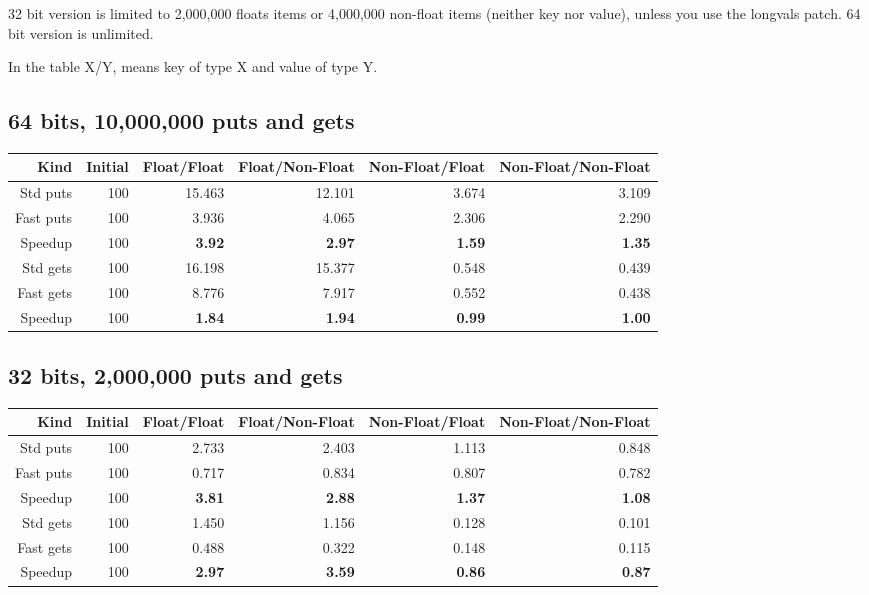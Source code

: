 \documentclass{article}
\begin{document}
32 bit version is limited to 2,000,000 floats items or 4,000,000
non-float items (neither key nor value), unless you use the longvals
patch.  64 bit version is unlimited.

In the table X/Y, means key of type X and value of type Y.

\subsection*{64 bits, 10,000,000 puts and gets}

\begin{tabular}{|r|r|r|r|r|r|} \hline
Kind & Initial & Float/Float & Float/Non-Float & Non-Float/Float & Non-Float/Non-Float \\ \hline
Std puts  & 100 & 15.463 & 12.101 & 3.674 & 3.109 \\ \hline
Fast puts & 100 & 3.936 & 4.065 & 2.306 & 2.290 \\ \hline
Speedup & 100 &\bf 3.92 &\bf 2.97 &\bf 1.59 &\bf 1.35 \\ \hline
Std gets & 100 & 16.198 & 15.377 & 0.548 & 0.439 \\ \hline
Fast gets & 100 & 8.776 & 7.917 & 0.552 & 0.438 \\ \hline
Speedup & 100 &\bf 1.84 &\bf 1.94 &\bf 0.99 &\bf 1.00  \\ \hline
\end{tabular}

\subsection*{32 bits, 2,000,000 puts and gets}

\begin{tabular}{|r|r|r|r|r|r|} \hline
Kind & Initial & Float/Float & Float/Non-Float & Non-Float/Float & Non-Float/Non-Float \\ \hline
Std puts  & 100 & 2.733 & 2.403 & 1.113 & 0.848 \\ \hline
Fast puts & 100 & 0.717 & 0.834 & 0.807 & 0.782 \\ \hline
Speedup   & 100 &\bf 3.81 &\bf 2.88 &\bf 1.37 &\bf 1.08 \\ \hline
Std gets  & 100 & 1.450 & 1.156 & 0.128 & 0.101 \\ \hline
Fast gets & 100 & 0.488 & 0.322 & 0.148 & 0.115 \\ \hline
Speedup   & 100 &\bf 2.97 &\bf 3.59 &\bf 0.86 &\bf 0.87  \\ \hline
\end{tabular}
\end{document}
